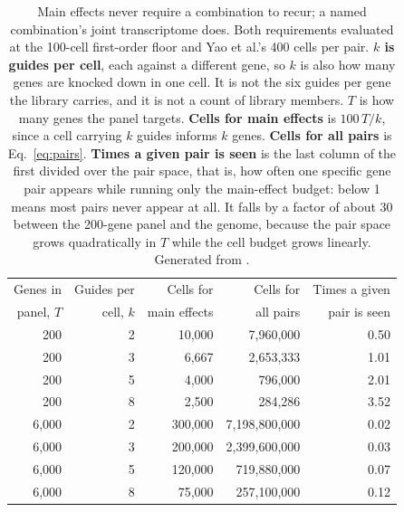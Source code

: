 \begin{table}[htbp]\centering
\footnotesize
\caption[]{Main effects never require a combination to recur; a named combination's joint transcriptome does. Both requirements evaluated at the 100-cell first-order floor and Yao et al.'s 400 cells per pair. \textbf{$k$ is guides per cell}, each against a different gene, so $k$ is also how many genes are knocked down in one cell. It is not the six guides per gene the library carries, and it is not a count of library members. \textbf{$T$} is how many genes the panel targets. \textbf{Cells for main effects} is $100\,T/k$, since a cell carrying $k$ guides informs $k$ genes. \textbf{Cells for all pairs} is Eq.~\ref{eq:pairs}. \textbf{Times a given pair is seen} is the last column of the first divided over the pair space, that is, how often one specific gene pair appears while running only the main-effect budget: below 1 means most pairs never appear at all. It falls by a factor of about 30 between the 200-gene panel and the genome, because the pair space grows quadratically in $T$ while the cell budget grows linearly. Generated from .}\label{tab:recovery}
\begin{tabular}{rrrrr}
\toprule
Genes in & Guides per & Cells for & Cells for & Times a given \\
panel, $T$ & cell, $k$ & main effects & all pairs & pair is seen \\
\midrule
200 & 2 & 10{,}000 & 7{,}960{,}000 & 0.50 \\
200 & 3 & 6{,}667 & 2{,}653{,}333 & 1.01 \\
200 & 5 & 4{,}000 & 796{,}000 & 2.01 \\
200 & 8 & 2{,}500 & 284{,}286 & 3.52 \\
6{,}000 & 2 & 300{,}000 & 7{,}198{,}800{,}000 & 0.02 \\
6{,}000 & 3 & 200{,}000 & 2{,}399{,}600{,}000 & 0.03 \\
6{,}000 & 5 & 120{,}000 & 719{,}880{,}000 & 0.07 \\
6{,}000 & 8 & 75{,}000 & 257{,}100{,}000 & 0.12 \\
\bottomrule
\end{tabular}
\end{table}
